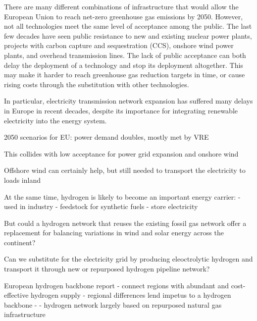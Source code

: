 
There are many different combinations of infrastructure that would allow
the European Union to reach net-zero greenhouse gas emissions by
2050. However, not all technologies meet the same level of acceptance
among the public. The last few decades have seen public resistance to
new and existing nuclear power plants, projects with carbon capture
and sequestration (CCS), onshore wind power plants, and overhead
transmission lines. The lack of public acceptance can both delay the
deployment of a technology and stop its deployment altogether. This
may make it harder to reach greenhouse gas reduction targets in time,
or cause rising costs through the substitution with other
technologies.


In particular, electricity transmission network expansion has suffered many
delays in Europe in recent decades, despite its importance for integrating
renewable electricity into the energy system.

2050 scenarios for EU: power demand doubles, mostly met by VRE

This collides with low acceptance for power grid expansion and onshore wind

Offshore wind can certainly help, but still needed to transport the electricity to loads inland


At the same time, hydrogen is likely to become an important energy carrier:
- used in industry
- feedstock for synthetic fuels
- store electricity

But could a hydrogen
network that reuses the existing fossil gas network offer a replacement
for balancing variations in wind and solar energy across the continent?

Can we substitute for the electricity grid by producing eleoctrolytic hydrogen
and transport it through new or repurposed hydrogen pipeline network?


European hydrogen backbone report
- connect regions with abundant and cost-effective hydrogen supply
- regional differences lend impetus to a hydrogen backbone
- \cite{gasforclimateEuropeanHydrogen2020,gasforclimateEuropeanHydrogen2021,gasforclimateExtendingEuropean2021,gasforclimateEuropeanHydrogen2022}
- hydrogen network largely based on repurposed natural gas infrastructure

